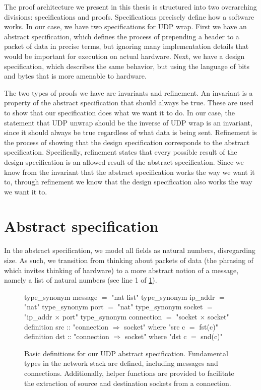 \documentclass[twoside]{memoir}
\begin{document}
The proof architecture we present in this thesis is structured into 
two overarching divisions: specifications and proofs.
Specifications precisely define how a software works.
In our case, we have two specifications for UDP wrap.
First we have an abstract specification,
which defines the process of prepending a header to a packet of data
in precise terms, but ignoring many implementation details that would
be important for execution on actual hardware.
Next, we have a design specification,
which describes the same behavior, but using the language of bits and bytes
that is more amenable to hardware.

The two types of proofs we have are invariants and refinement.
An invariant is a property of the abstract specification that should always
be true. These are used to show that our specification does what we want it to
do. In our case, the statement that UDP unwrap should be the inverse of UDP wrap
is an invariant,
since it should always be true regardless of what data is being sent.
Refinement is the process of showing that the design specification 
corresponds to the abstract specification.
Specifically, refinement states that every possible result of the design
specification is an allowed result of the abstract specification.
Since we know from the invariant that the abstract specification 
works the way we want it to, through refinement we know
that the design specification also works the way we want it to.


\section{Abstract specification}
In the abstract specification, we model all fields as natural numbers,
disregarding size.
As such, we transition from thinking about packets of data
(the phrasing of which invites thinking of hardware)
to a more abstract notion of a message,
namely a list of natural numbers (see line 1 of \ref{fig:defs-abstract}).

\begin{figure}[htpb]
    \centering
\begin{nlisting}[language=isabelle]
type_synonym message $=$ "nat list"
type_synonym ip_addr $=$ "nat"
type_synonym port $=$ "nat"
type_synonym socket $=$ "ip_addr $\times$ port"
type_synonym connection $=$ "socket $\times$ socket"
definition src :: "connection $\Rightarrow$ socket" where "src c $=$ fst(c)"
definition dst :: "connection $\Rightarrow$ socket" where "dst c $=$ snd(c)"
\end{nlisting}
    \caption{Basic definitions for our UDP abstract specification.
        Fundamental types in the network stack are defined,
        including messages and connections.
        Additionally, helper functions are provided to facilitate 
        the extraction of source and destination sockets from a connection.}
    \label{fig:defs-abstract}
\end{figure}
\end{document}
